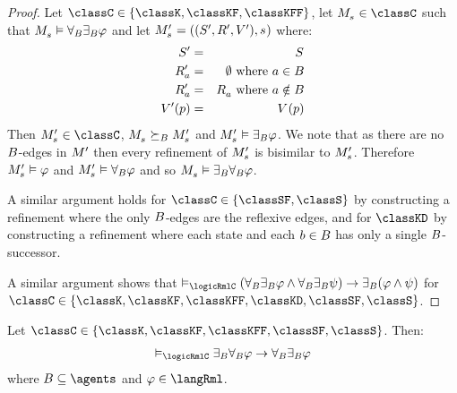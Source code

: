 \begin{proof}
Let $\classC \in \{\classK, \classKF, \classKFF\}$, let $\kPModel{\kStateS} \in \classC$ such that $\kPModel{\kStateS} \entails \allrefsBs \somerefsBs \phi$ and let $\kPModelAndTupleP{\kStateS}$ where:
\begin{eqnarray*}
    \kStatesP &=& \kStates\\
    \kAccessibilityPA &=& \emptyset \text{ where } \agentA \in \agentsB\\
    \kAccessibilityPA &=& \kAccessibilityA \text{ where } \agentA \notin \agentsB\\
    \kValuationP(\atomP) &=& \kValuation(\atomP)
\end{eqnarray*}
Then $\kPModelP{\kStateS} \in \classC$, $\kPModel{\kStateS} \simulatesBs \kPModelP{\kStateS}$ and $\kPModelP{\kStateS} \entails \somerefsBs \phi$.
We note that as there are no $B$-edges in ${M^{\prime}_{}}$ then every refinement of $\kPModelP{\kStateS}$ is bisimilar to $\kPModelP{\kStateS}$.
Therefore $\kPModelP{\kStateS} \entails \phi$ and $\kPModelP{\kStateS} \entails \allrefsBs \phi$ and so $\kPModel{\kStateS} \entails \somerefsBs \allrefsBs \phi$.

A similar argument holds for $\classC \in \{\classSF, \classS\}$ by constructing a refinement where the only $B$-edges are the reflexive edges,
and for $\classKD$ by constructing a refinement where each state and each $b \in B$ has only a single $B$-successor.

A similar argument shows that $\entails_\logicRmlC (\allrefsBs \somerefsBs \phi \land \allrefsBs \somerefsBs \psi) \implies \somerefsBs (\phi \land \psi)$ for $\classC \in \{\classK, \classKF, \classKFF, \classKD, \classSF, \classS\}$.
\end{proof}

\begin{proposition}\label{rml-church-rosser}
Let $\classC \in \{\classK, \classKF, \classKFF, \classSF, \classS\}$. Then:
$$
\begin{array}{l}
    \entails_\logicRmlC \somerefsBs \allrefsBs \phi \implies \allrefsBs \somerefsBs \phi
\end{array}
$$
where $\agentsB \subseteq \agents$ and $\phi \in \langRml$.
\end{proposition}

